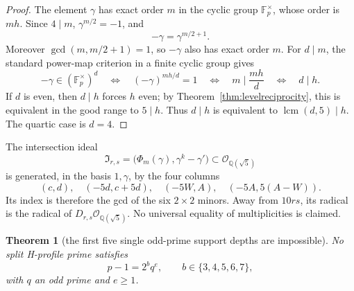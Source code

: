 \documentclass[11pt]{amsart}
\newtheorem{theorem}{Theorem}[section]
\theoremstyle{definition}
\theoremstyle{remark}
\newcommand{\F}{\mathbb{F}}
\newcommand{\Q}{\mathbb{Q}}
\begin{document}
\begin{proof}
The element \(\gamma\) has exact order \(m\) in the cyclic group
\(\F_p^\times\), whose order is \(mh\). Since \(4\mid m\),
\(\gamma^{m/2}=-1\), and
\[
-\gamma=\gamma^{m/2+1}.
\]
Moreover \(\gcd(m,m/2+1)=1\), so \(-\gamma\) also has exact order \(m\).
For \(d\mid m\), the standard power-map criterion in a finite cyclic
group gives
\[
-\gamma\in(\F_p^\times)^d
\quad\Longleftrightarrow\quad
(-\gamma)^{mh/d}=1
\quad\Longleftrightarrow\quad
m\mid\frac{mh}{d}
\quad\Longleftrightarrow\quad d\mid h.
\]
If \(d\) is even, then \(d\mid h\) forces \(h\) even; by
Theorem~\ref{thm:levelreciprocity}, this is equivalent in the good
range to \(5\mid h\). Thus \(d\mid h\) is equivalent to
\(\operatorname{lcm}(d,5)\mid h\). The quartic case is \(d=4\).
\end{proof}

The intersection ideal
\[
\mathfrak I_{r,s}
=\bigl(\Phi_m(\gamma),\gamma^k-\gamma'\bigr)
\subset\mathcal O_{\Q(\sqrt5)}
\]
is generated, in the basis \(1,\gamma\), by the four columns
\[
(c,d),\quad(-5d,c+5d),\quad(-5W,A),\quad(-5A,5(A-W)).
\]
Its index is therefore the gcd of the six \(2\times2\) minors. Away
from \(10rs\), its radical is the radical of
\(D_{r,s}\mathcal O_{\Q(\sqrt5)}\). No universal equality of
multiplicities is claimed.

\begin{theorem}[the first five single odd-prime support depths are impossible]
\label{thm:Hsingleprime}
No split H-profile prime satisfies
\[
p-1=2^bq^e,\qquad b\in\{3,4,5,6,7\},
\]
with \(q\) an odd prime and \(e\ge1\).
\end{theorem}
\end{document}
